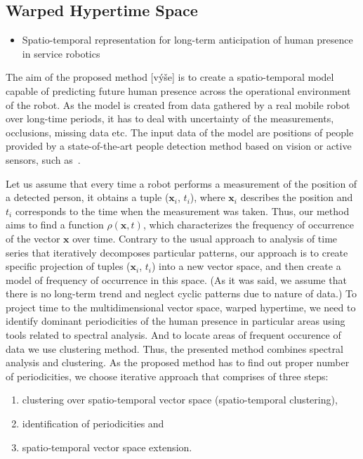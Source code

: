 \subsection{Warped Hypertime Space}

\begin{itemize}
    \item Spatio-temporal representation for long-term anticipation of human presence in service robotics
\end{itemize}

The aim of the proposed method [výše] is to create a spatio-temporal model capable of predicting future human presence across the operational environment of the robot.
As the model is created from data gathered by a real mobile robot over long-time periods, it has to deal with uncertainty of the measurements, occlusions, missing data etc. 
The input data of the model are positions of people provided by a state-of-the-art people detection method based on vision or active sensors, such as~\cite{yan2017online}.
 
Let us assume that every time a robot performs a measurement of the position of a detected person, it obtains a tuple ($\mathbf{x}_i$, $t_i$), where $\mathbf{x}_i$ describes the position and $t_i$ corresponds to the time when the measurement was taken.
Thus, our method aims to find a function $\rho(\mathbf{x},t)$, which characterizes the frequency of occurrence of the vector $\mathbf{x}$ over time.
Contrary to the usual approach to analysis of time series that iteratively decomposes particular patterns, our approach is to create specific projection of tuples ($\mathbf{x}_i$, $t_i$) into a new vector space, and then create a model of frequency of occurrence in this space.  
(As it was said, we assume that there is no long-term trend and neglect cyclic patterns due to nature of data.)
To project time to the multidimensional vector space, warped hypertime, we need to identify dominant periodicities of the human presence in particular areas using tools related to spectral analysis.
And to locate areas of frequent occurence of data we use clustering method.
Thus, the presented method combines spectral analysis and clustering. 
As the proposed method has to find out proper number of periodicities, we choose iterative approach that comprises of three steps:
%
\begin{enumerate}
\item clustering over spatio-temporal vector space (spatio-temporal clustering), 
\item identification of periodicities and
\item spatio-temporal vector space extension.
\end{enumerate}

